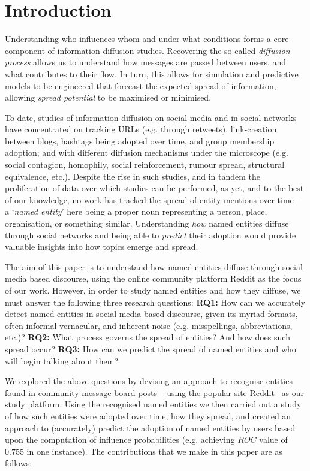 \documentclass[acmsmall]{acmart}
\begin{document}
\section{Introduction}\label{sec:introduction}
Understanding who influences whom and under what conditions forms a core component of information diffusion studies.
Recovering the so-called \emph{diffusion process} allows us to understand how messages are passed between users, and what contributes to their flow.
In turn, this allows for simulation and predictive models to be engineered that forecast the expected spread of information, allowing \emph{spread potential} to be maximised or minimised.

To date, studies of information diffusion on social media and in social networks have concentrated on tracking URLs (e.g. through retweets), link-creation between blogs, hashtags being adopted over time, and group membership adoption; and with different diffusion mechanisms under the microscope (e.g. social contagion, homophily, social reinforcement, rumour spread, structural equivalence, etc.).
Despite the rise in such studies, and in tandem the proliferation of data over which studies can be performed, as yet, and to the best of our knowledge, no work has tracked the spread of entity mentions over time -- a `\emph{named entity}' here being a proper noun representing a person, place, organisation, or something similar.
Understanding \emph{how} named entities diffuse through social networks and being able to \emph{predict} their adoption would provide valuable insights into how topics emerge and spread.

The aim of this paper is to understand how named entities diffuse through social media based discourse, using the online community platform Reddit as the focus of our work.
However, in order to study named entities and how they diffuse, we must answer the following three research questions: \textbf{RQ1:} How can we accurately detect named entities in social media based discourse, given its myriad formats, often informal vernacular, and inherent noise (e.g. misspellings, abbreviations, etc.)? \textbf{RQ2:} What process governs the spread of entities? And how does such spread occur? \textbf{RQ3:} How can we predict the spread of named entities and who will begin talking about them?	

We explored the above questions by devising an approach to recognise entities found in community message board posts -- using the popular site Reddit~\cite{duggan20136} as our study platform.
Using the recognised named entities we then carried out a study of how such entities were adopted over time, how they spread, and created an approach to (accurately) predict the adoption of named entities by users based upon the computation of influence probabilities (e.g. achieving $ROC$ value of $0.755$ in one instance).
The contributions that we make in this paper are as follows:
\end{document}
